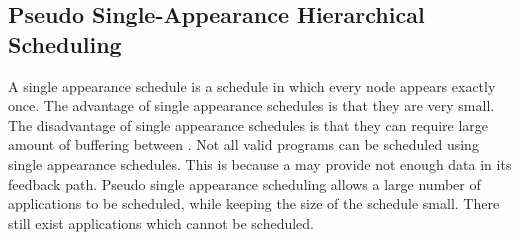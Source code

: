 \subsection{Pseudo Single-Appearance Hierarchical Scheduling}
\label{sec:sas}

\begin{comment}
\begin{figure}
\begin{minipage}{1.5in}
\centering \psfig{figure=pipeline-steady-state.eps,width=0.6in} \\
{\protect\small (a) A sample {\pipeline}}
\end{minipage}
~
\begin{minipage}{1.5in}
\centering \psfig{figure=splitjoin-steady-state.eps,width=1.2in} \\
{\protect\small (b) A sample {\splitjoin}}
\end{minipage}
~
\begin{minipage}{2.5in}
\centering \psfig{figure=feedback-hierarchical.eps,width=1.0in} \\
{\protect\small (c) A sample {\feedbackloop}.\\ $delay_{fl} = 15$ \\
The $L$ {\filter} has been flipped upside-down for clarity. \\$e_L
= 9, o_L = 5, u_L = 6$ }
\end{minipage}
\caption{Sample {\StreamIt} streams used for Pseudo
Single-Appearance Hierarchical Scheduling}
\label{fig:hierarchical-schedule}
\end{figure}
\end{comment}

A single appearance schedule is a schedule in which every node
appears exactly once. The advantage of single appearance schedules
is that they are very small. The disadvantage of single appearance
schedules is that they can require large amount of buffering
between \filters. Not all valid \StreamIt programs can be
scheduled using single appearance schedules. This is because a
\feedbackloop may provide not enough data in its feedback path.
Pseudo single appearance scheduling allows a large number of
applications to be scheduled, while keeping the size of the
schedule small. There still exist applications which cannot be
scheduled.

